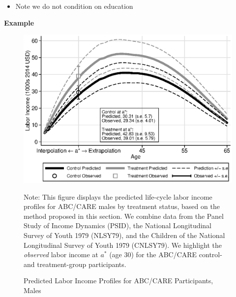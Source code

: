 \documentclass[static]{JJH-Beamer}
\begin{document}
\begin{itemize}
\item Note we do not condition on education
\end{itemize}

\clearpage

\begin{frame}

\begin{center}
\textbf{Example}
\end{center}

\vspace{-4mm}

\begin{figure}[H]
\caption{Predicted Labor Income Profiles for ABC/CARE Participants, Males}\label{fig:labor-income-profilesc}
\begin{center}
\includegraphics[width=.6\textwidth]{output/labor_25-65_pset1_mset3_male.eps}
\end{center}
\tiny \flushleft Note: This figure displays the predicted life-cycle labor income profiles for ABC/CARE males by treatment status, based on the method proposed in this section. We combine data from the Panel Study of Income Dynamics (PSID), the National Longitudinal Survey of Youth 1979 (NLSY79), and the Children of the National Longitudinal Survey of Youth 1979 (CNLSY79). We highlight the \textit{observed} labor income at $a^*$ (age 30) for the ABC/CARE control- and treatment-group participants.\\
\end{figure}

\end{frame}
\end{document}
